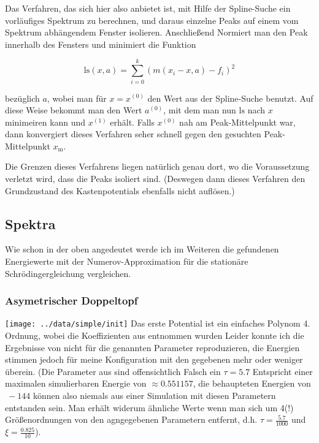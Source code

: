 \documentclass[10pt,a4paper,german]{scrartcl}
\begin{document}
       Das Verfahren, das sich hier also anbietet ist, mit Hilfe der
       Spline-Suche ein vorläufiges Spektrum zu berechnen, und daraus
       einzelne Peaks auf einem vom Spektrum abhängendem Fenster isolieren.
       Anschließend Normiert man den Peak innerhalb des Fensters und minimiert
       die Funktion
       
       \begin{equation}
         \mathrm{ls}(x,a) = \sum_{i = 0}^{k} (m(x_i - x, a) - f_i)^2
       \end{equation}
       
       bezüglich $a$, wobei man für $x=x^{(0)}$ den Wert aus der Spline-Suche
       benutzt. Auf diese Weise bekommt man den Wert $a^{(0)}$, mit dem man
       nun $\mathrm{ls}$ nach $x$ minimeiren kann und $x^{(1)}$ erhält.
       Falls $x^{(0)}$ nah
       am Peak-Mittelpunkt war, dann konvergiert dieses Verfahren seher schnell
       gegen den gesuchten Peak-Mittelpunkt $x_\mathrm{m}$.
       
       Die Grenzen dieses Verfahrens liegen natürlich genau dort, wo die
       Voraussetzung verletzt wird, dass die Peaks isoliert sind. 
       (Deswegen dann dieses Verfahren den Grundzustand des Kastenpotentials 
       ebenfalls nicht auflösen.)
       
   \subsection{Spektra}
		Wie schon in der oben angedeutet werde ich im Weiteren die gefundenen
		Energiewerte mit der Numerov-Approximation für die stationäre 
		Schrödingergleichung vergleichen.
		

  	  \subsubsection{Asymetrischer Doppeltopf}
			  \texttt{[image: ../data/simple/init]}
      \newpage
  		Das erste Potential ist ein einfaches Polynom 4. Ordnung, wobei die
  		Koeffizienten aus \cite{FFS} entnommen wurden Leider konnte ich die
  		Ergebnisse von \cite{FFS} nicht für die genannten Parameter reproduzieren, 
  		die Energien stimmen jedoch für meine Konfiguration mit den gegebenen mehr 
  		oder weniger überein. (Die Parameter aus \cite{FFS} sind offensichtlich Falsch
  		ein $\tau = 5.7$ Entspricht einer maximalen simulierbaren Energie von
  		$\approx 0.551157$, die behaupteten Energien von $~-144$ können also niemals
  		aus einer Simulation mit diesen Parametern entstanden sein. Man erhält 
  		widerum ähnliche Werte wenn man sich um 4(!) Größenordnungen von
  		den agngegebenen Parametern entfernt, d.h. $\tau = \frac{5.7}{1000}$ und
  		$\xi = \frac{0.825}{10}$).
  		
\end{document}

